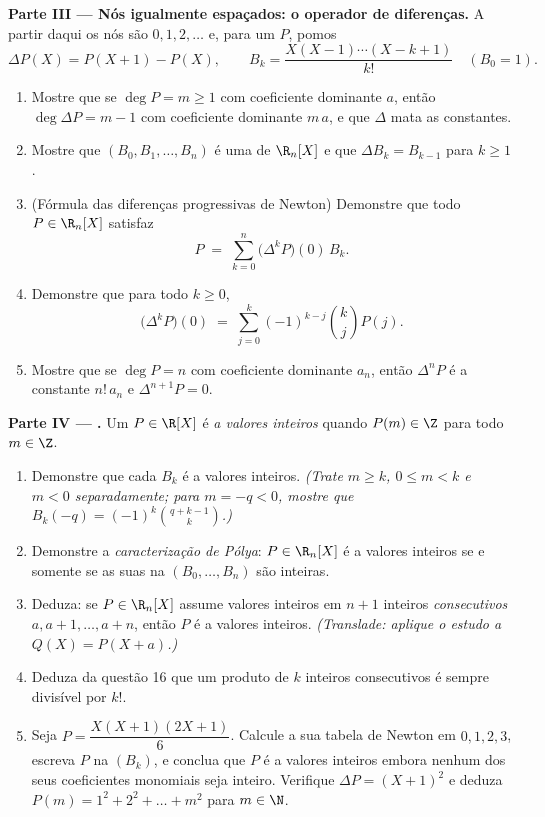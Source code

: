 \begin{problem}
\medskip
\noindent\textbf{Parte III --- Nós igualmente espaçados: o operador
de diferenças.} A partir daqui os nós são $0, 1, 2, \dots$ e, para um
 $P$, pomos
\[
\Delta P(X) = P(X + 1) - P(X),
\qquad
B_k = \frac{X(X-1)\cdots(X-k+1)}{k!} \quad (B_0 = 1).
\]
\begin{enumerate}[resume]
  \item Mostre que se $\deg P = m \geq 1$ com coeficiente dominante
        $a$, então $\deg \Delta P = m - 1$ com coeficiente dominante
        $m\,a$, e que $\Delta$ mata as constantes.
  \item Mostre que $(B_0, B_1, \dots, B_n)$ é uma  de
        $\R_n[X]$ e que $\Delta B_k = B_{k-1}$ para $k \geq 1$.
  \item (Fórmula das diferenças progressivas de Newton) Demonstre
        que todo $P
        \in \R_n[X]$ satisfaz
        \[
        P \;=\; \sum_{k=0}^{n} \bigl(\Delta^{k} P\bigr)(0)\, B_k .
        \]
  \item Demonstre que para todo $k \geq 0$,
        \[
        \bigl(\Delta^{k} P\bigr)(0) \;=\;
        \sum_{j=0}^{k} (-1)^{k-j} \binom{k}{j} P(j) .
        \]
  \item Mostre que se $\deg P = n$ com coeficiente dominante $a_n$,
        então $\Delta^{n} P$ é a constante $n!\,a_n$ e
        $\Delta^{n+1} P = 0$.
\end{enumerate}

\medskip
\noindent\textbf{Parte IV --- .} Um
 $P \in \R[X]$ é \emph{a valores inteiros} quando $P(m) \in
\Z$
para todo $m \in \Z$.
\begin{enumerate}[resume]
  \item Demonstre que cada $B_k$ é a valores inteiros.
        \emph{(Trate $m
        \geq k$, $0 \leq m < k$ e $m < 0$ separadamente; para
        $m =
        -q < 0$, mostre que $B_k(-q) = (-1)^k \binom{q + k - 1}{k}$.)}
  \item Demonstre a \emph{caracterização de Pólya}: $P \in \R_n[X]$
        é a valores inteiros se e somente se as suas  na
         $(B_0, \dots, B_n)$ são inteiras.
  \item Deduza: se $P \in \R_n[X]$ assume valores inteiros em $n + 1$
        inteiros \emph{consecutivos} $a, a+1, \dots, a+n$, então $P$
        é a valores inteiros. \emph{(Translade: aplique o estudo a
        $Q(X)
        = P(X + a)$.)}
  \item Deduza da questão 16 que um produto de $k$ inteiros
        consecutivos é sempre divisível por $k!$.
  \item Seja $P = \dfrac{X(X+1)(2X+1)}{6}$. Calcule a sua tabela de Newton em
        $0, 1, 2, 3$, escreva $P$ na  $(B_k)$, e conclua que $P$ é a
        valores inteiros embora nenhum dos seus coeficientes
        monomiais seja inteiro. Verifique $\Delta P =
        (X+1)^2$ e deduza $P(m) = 1^2 + 2^2 + \dots + m^2$
        para $m \in \N$.
\end{enumerate}


\end{problem}

